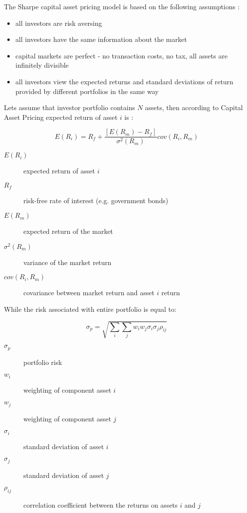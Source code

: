 The Sharpe capital asset pricing model is based on the following assumptions \cite{CAPM}:

\begin{itemize}
  \item all investors are risk aversing
  \item all investors have the same information about the market
  \item capital markets are perfect - no transaction costs, no tax, all assets are infinitely divisible
  \item all investors view the expected returns and standard deviations of return provided by different portfolios in the same way
\end{itemize}
 
Lets assume that investor portfolio contains $N$ assets, then according to Capital Asset Pricing expected return of asset $i$ is \cite{CAPM}: 

\begin{equation}
\label{first_eq}
 E(R_{i})  = R_{f} + \frac{ [E(R_{m}) - R_{f}]} {\sigma^2(R_{m})} cov(R_{i}, R_{m})
\end{equation} 

\begin{description}
  \item [$E(R_{i})$]
    expected return of asset $i$
  \item [$R_{f}$]
    risk-free rate of interest (e.g. government bonds)
  \item [$E(R_{m})$]
    expected return of the market
  \item [$\sigma^2(R_{m})$]
    variance of the market return
  \item [$cov(R_{i}, R_{m})$]
    covariance between market return and asset $i$ return
\end{description}

While the risk associated with entire portfolio is equal to:

\begin{equation}
\label{sec_eq}
 \sigma_{p}  = \sqrt{\sum_{i} \sum_{j} w_{i}w_{j} \sigma_{i} \sigma_{j} \rho_{ij}}
\end{equation} 

\begin{description}
  \item [$\sigma_{p}$]
    portfolio risk
  \item [$w_{i}$]
    weighting of component asset $i$
  \item [$w_{j}$]
    weighting of component asset $j$
  \item [$\sigma_{i}$]
    standard deviation of asset $i$
  \item [$\sigma_{j}$]
    standard deviation of asset $j$
  \item [$\rho_{ij}$]
    correlation coefficient between the returns on assets $i$ and $j$
\end{description}
 
